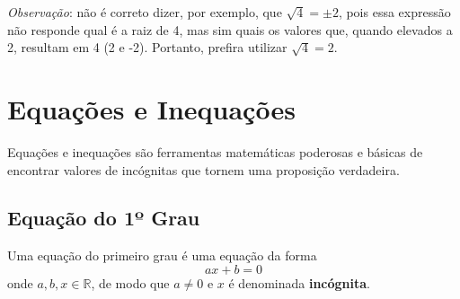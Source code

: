 \documentclass[13pt,letterpaper]{article}
\begin{document}
\emph{Observação}: não é correto dizer, por exemplo, que $\sqrt{4} = \pm 2$, pois essa expressão não responde qual é a raiz de 4, mas sim quais os valores que, quando elevados a 2, resultam em 4 (2 e -2).  Portanto, prefira utilizar $\sqrt{4} = 2$.

\section{Equações e Inequações}
Equações e inequações são ferramentas matemáticas poderosas e básicas de encontrar valores de incógnitas que tornem uma proposição verdadeira. 

\subsection{Equação do 1º Grau}
Uma equação do primeiro grau é uma equação da forma
\begin{displaymath}
    ax + b = 0
\end{displaymath}
onde $a, b, x  \in \mathbb{R}$, de modo que $a \ne 0$ e $x$ é denominada \textbf{incógnita}.
\end{document}
